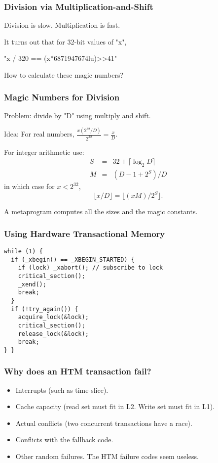 \documentclass[xcolor=dvipsnames,14pt]{beamer}
\begin{document}
\begin{frame}[fragile]
\frametitle{Division via Multiplication-and-Shift}

Division is slow.  Multiplication is fast.

It turns out that for 32-bit values of "x",
\begin{center}
"x / 320 == (x*6871947674lu)>>41"
\end{center}

How to calculate these magic numbers? 
\end{frame}

\begin{frame}[fragile]
\frametitle{Magic Numbers for Division}

Problem: divide by "D" using multiply and shift.

Idea:  For real numbers, $\frac{x (2^{32}/D)}{2^{32}} = \frac{x}{D}$.

For integer arithmetic use:
\begin{eqnarray*}
S & = & 32+\lceil \log_2 D \rceil \\
M & = & (D-1+2^S)/D 
\end{eqnarray*}
in which case for $x<2^{32}$,
\[
\lfloor x/D \rfloor = \lfloor (xM)/2^S \rfloor.
\]

A metaprogram computes all the sizes and the magic constants.
\end{frame}

\begin{frame}[fragile]
\frametitle{Using Hardware Transactional Memory}

\begin{verbatim}
while (1) {
  if (_xbegin() == _XBEGIN_STARTED) {
    if (lock) _xabort(); // subscribe to lock
    critical_section();
    _xend();
    break;
  }
  if (!try_again()) {
    acquire_lock(&lock);
    critical_section();
    release_lock(&lock);
    break;
} }
\end{verbatim}
\end{frame}

\begin{frame}
\frametitle{Why does an HTM transaction fail?}
\begin{itemize}
\item Interrupts (such as time-slice).
\item Cache capacity (read set must fit in L2.  Write set must fit in L1).
\item Actual conflicts (two concurrent transactions have a race).
\item Conflicts with the fallback code.
\item Other random failures.  The HTM failure codes seem useless.
\end{itemize}

\end{frame}
\end{document}
